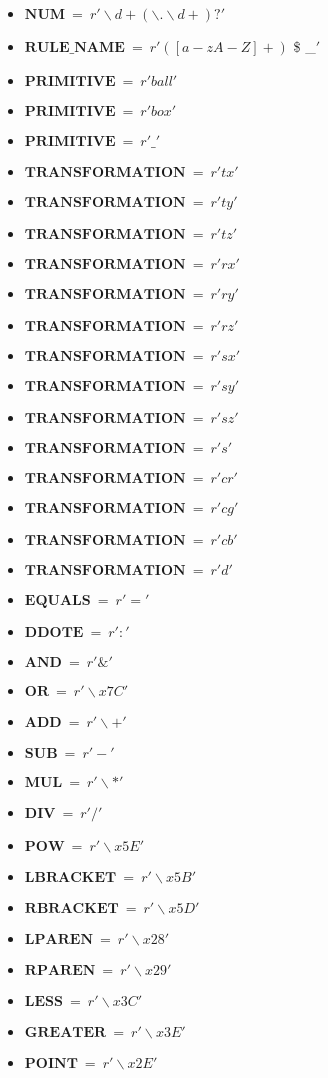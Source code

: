 \begin{itemize}
 \item []$\mathbf{NUM}\ =\ r'\backslash d+(\backslash .\backslash d+)?'$
 
 \item []$\mathbf{RULE\_NAME}\ =\ r'([a-zA-Z]+) $\textbar $ $ \$ $ $\textbar \_$ '$
 \item []$\mathbf{PRIMITIVE}\ =\ r'ball'$
 \item []$\mathbf{PRIMITIVE}\ =\ r'box'$
 \item []$\mathbf{PRIMITIVE}\ =\ r'\_'$
 \item []$\mathbf{TRANSFORMATION}\ =\ r'tx'$
 \item []$\mathbf{TRANSFORMATION}\ =\ r'ty'$
 \item []$\mathbf{TRANSFORMATION}\ =\ r'tz'$
 \item []$\mathbf{TRANSFORMATION}\ =\ r'rx'$
 \item []$\mathbf{TRANSFORMATION}\ =\ r'ry'$
 \item []$\mathbf{TRANSFORMATION}\ =\ r'rz'$
 \item []$\mathbf{TRANSFORMATION}\ =\ r'sx'$
 \item []$\mathbf{TRANSFORMATION}\ =\ r'sy'$
 \item []$\mathbf{TRANSFORMATION}\ =\ r'sz'$
 \item []$\mathbf{TRANSFORMATION}\ =\ r's'$
 \item []$\mathbf{TRANSFORMATION}\ =\ r'cr'$
 \item []$\mathbf{TRANSFORMATION}\ =\ r'cg'$
 \item []$\mathbf{TRANSFORMATION}\ =\ r'cb'$
 \item []$\mathbf{TRANSFORMATION}\ =\ r'd'$
 \item []$\mathbf{EQUALS}\ =\ r'='$
 \item []$\mathbf{DDOTE}\ =\ r':'$
 \item []$\mathbf{AND}\ =\ r'\&'$ 
 \item []$\mathbf{OR}\ =\ r'\backslash x7C'$  
 \item []$\mathbf{ADD}\ =\ r'\backslash +'$
 \item []$\mathbf{SUB}\ =\ r'-'$
 \item []$\mathbf{MUL}\ =\ r'\backslash *'$
 \item []$\mathbf{DIV}\ =\ r'/'$
 \item []$\mathbf{POW}\ =\ r'\backslash x5E'$
 \item []$\mathbf{LBRACKET}\ =\ r'\backslash x5B'$
 \item []$\mathbf{RBRACKET}\ =\ r'\backslash x5D'$
 \item []$\mathbf{LPAREN}\ =\ r'\backslash x28'$
 \item []$\mathbf{RPAREN}\ =\ r'\backslash x29'$
 \item []$\mathbf{LESS}\ =\ r'\backslash x3C'$
 \item []$\mathbf{GREATER}\ =\ r'\backslash x3E'$
 \item []$\mathbf{POINT}\ =\ r'\backslash x2E'$
\end{itemize}


